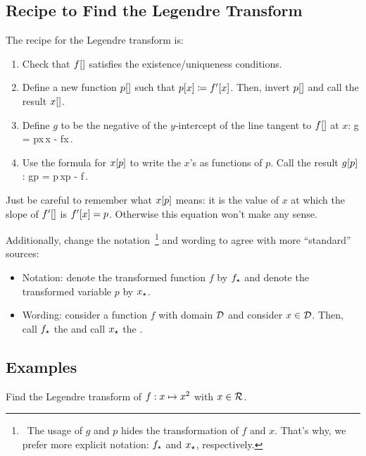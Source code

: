 \subsection{Recipe to Find the Legendre Transform}\label{subsubsec:recipelegendretrans}
The recipe for the Legendre transform is:
\begin{enumerate}
\item Check that $f\!\left[{}\right]$ satisfies the existence/uniqueness conditions.
%
\item Define a new function $p\!\left[{}\right]$ such that $p\!\left[{x}\right]\coloneqq f'\!\left[{x}\right]$. Then, invert $p\!\left[{}\right]$ and call the result $x\!\left[{}\right]$. 
%
\item Define $g$ to be the negative of the $y$-intercept of the line tangent to $f\!\left[{}\right]$ at $x$:
\beq
g = p\vat x\,x - f\vat x\,.
\eeq
%
\item Use the formula for $x\!\left[{p}\right]$ to write the $x$'s as functions of $p$. Call the result $g\!\left[{p}\right]$:
\beq
g\vat p = p\,x\vat p - f\,.
\eeq
\end{enumerate}
Just be careful to remember what $x\!\left[{p}\right]$ means: it is the value of $x$ at which the slope of $f'\!\left[{}\right]$ is $f'\!\left[{x}\right] = p$. Otherwise this equation won't make any sense.

Additionally, change the notation~\footnote{~The usage of $g$ and $p$ hides the transformation of $f$ and $x$. That's why, we prefer more explicit notation: ${f}_{\star}$ and ${x}_{\star}$, respectively.} and wording to agree with more ``standard'' sources:
\begin{itemize}
\item Notation: denote the transformed function $f$ by ${f}_{\star}$ and denote the transformed variable $p$ by ${x}_{\star}$.
\item Wording: consider a function $f$ with domain $\mathcal{D}$ and consider $x\in\mathcal{D}$. Then, call ${f}_{\star}$ the  and call ${x}_{\star}$ the .
\end{itemize}


\subsection{Examples}
Find the Legendre transform of ${f}:{x}\mapsto{x^2}$ with $x\in\mathcal{R}$.

